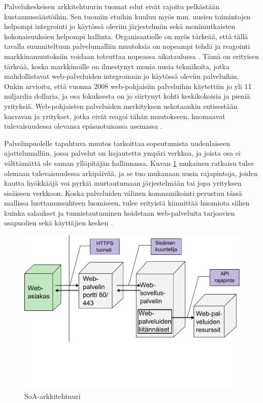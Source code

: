 Palvelukeskeisen arkkitehtuurin tuomat edut eivät rajoitu pelkästään
kustannussäästöihin. Sen tuomiin etuihin kuuluu myös mm. uusien toimintojen
helpompi integrointi jo käytössä oleviin järjestelmiin sekä monimutkaisten
kokonaisuuksien helpompi hallinta. Organisaatiolle on myös tärkeää, että tällä
tavalla suunniteltuun palvelumalliin muutoksia on nopeampi tehdä ja reagointi
markkinamuutoksiin voidaan toteuttaa nopeassa aikataulussa \cite{WEB2c}. Tämä on
erityisen tärkeää, koska markkinoille on ilmestynyt monia uusia tekniikoita,
jotka mahdollistavat web-palveluiden integroinnin jo käytössä oleviin
palveluihin. Onkin arvioitu, että vuonna 2008 web-pohjaisiin palveluihin
käytettiin jo yli 11 miljardia dollaria, ja osa fokuksesta on jo siirtynyt
kohti keskikokoisia ja pieniä yrityksiä. Web-pohjaisten palveluiden merkityksen
uskotaankin entisestään kasvavan ja yritykset, jotka eivät reagoi tähän
muutokseen, huomaavat tulevaisuudessa olevansa epäsuotuisassa asemassa \cite{WEB2b}.

Palvelinpuolelle tapahtuva muutos tarkoittaa sopeutumista uudenlaiseen
ajattelumalliin, jossa palvelut on hajautettu ympäri verkkoa, ja joista osa ei
välttämättä ole saman ylläpitäjän hallinnassa. Kuvan \ref{soa} mukainen ratkaisu
tulee olemaan tulevaisuudessa arkipäivää, ja se tuo mukanaan uusia rajapintoja,
joiden kautta hyökkääjä voi pyrkiä murtautumaan järjestelmään tai jopa
yrityksen sisäiseen verkkoon. Koska palveluiden välinen kommunikointi perustuu
tässä mallissa luottamussuhteen luomiseen, tulee erityistä kiinnittää huomiota
siihen kuinka salaukset ja tunnistautuminen hoidetaan web-palveluita tarjoavien
osapuolien sekä käyttäjien kesken \cite{WEB2b}.

\begin{figure}[htp]
\centering
\includegraphics[width=12cm]{pics/soa.pdf}
\caption{SoA-arkkitehtuuri}
\label{soa}
\end{figure}

